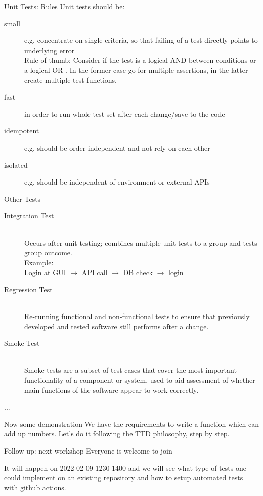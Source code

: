 \documentclass{beamer}
\begin{document}
\begin{frame}{Unit Tests: Rules}
Unit tests should be:
\begin{description}

\item[small] e.g. concentrate on single criteria, so that failing of a test directly points to underlying error \\
Rule of thumb: Consider if the test is a logical AND between conditions or a logical OR . In the former case go for multiple assertions, in the latter create multiple test functions.
\item[fast] in order to run whole test set after each change/save to the code
\item[idempotent] e.g. should be order-independent and not rely on each other
\item[isolated] e.g. should be independent of environment or external APIs
\end{description}
\end{frame}


\begin{frame}{Other Tests}
\begin{description}
\item[Integration Test] \hfill\\
Occurs after unit testing; combines multiple unit tests to a group and tests group outcome.\\
Example:\\
Login at GUI $\rightarrow$ API call $\rightarrow$ DB check $\rightarrow$ login
\item[Regression Test] \hfill \\
Re-running functional and non-functional tests to ensure that previously developed and tested software still performs after a change.
\item[Smoke Test] \hfill\\
Smoke tests are a subset of test cases that cover the most important functionality of a component or system, used to aid assessment of whether main functions of the software appear to work correctly.
\item[...]
\end{description}
\end{frame}


\begin{frame}{Now some demonstration}
We have the requirements to write a function which can add up numbers. Let's do it following the TTD philosophy, step by step.
\end{frame}


\begin{frame}{Follow-up: next workshop}
Everyone is welcome to join

\vspace{15pt}

It will happen on 2022-02-09 1230-1400 and we will see what type of tests one could implement on an existing repository and how to setup automated tests with github actions.
 
\end{frame}
\end{document}
